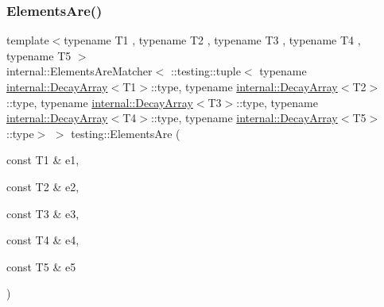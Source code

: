 \subsubsection{\texorpdfstring{ElementsAre()}{ElementsAre()}\hspace{0.1cm}{\footnotesize\ttfamily [6/11]}}
{\footnotesize\ttfamily template$<$typename T1 , typename T2 , typename T3 , typename T4 , typename T5 $>$ \\
internal\+::\+Elements\+Are\+Matcher$<$ \+::testing\+::tuple$<$ typename \mbox{\hyperlink{structtesting_1_1internal_1_1_decay_array}{internal\+::\+Decay\+Array}}$<$T1$>$\+::type, typename \mbox{\hyperlink{structtesting_1_1internal_1_1_decay_array}{internal\+::\+Decay\+Array}}$<$T2$>$\+::type, typename \mbox{\hyperlink{structtesting_1_1internal_1_1_decay_array}{internal\+::\+Decay\+Array}}$<$T3$>$\+::type, typename \mbox{\hyperlink{structtesting_1_1internal_1_1_decay_array}{internal\+::\+Decay\+Array}}$<$T4$>$\+::type, typename \mbox{\hyperlink{structtesting_1_1internal_1_1_decay_array}{internal\+::\+Decay\+Array}}$<$T5$>$\+::type$>$ $>$ testing\+::\+Elements\+Are (\begin{DoxyParamCaption}\item[{const T1 \&}]{e1,  }\item[{const T2 \&}]{e2,  }\item[{const T3 \&}]{e3,  }\item[{const T4 \&}]{e4,  }\item[{const T5 \&}]{e5 }\end{DoxyParamCaption})\hspace{0.3cm}{\ttfamily [inline]}}

\mbox{\label{namespacetesting_a725b7a52e5eea9fe8f4ce46be6fd7159}} 

